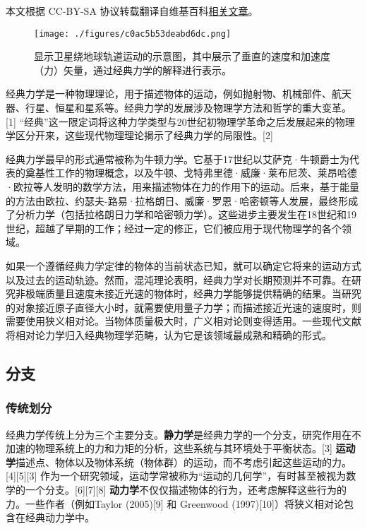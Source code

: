 
本文根据 CC-BY-SA 协议转载翻译自维基百科\href{https://en.wikipedia.org/wiki/Classical_mechanics}{相关文章}。

\begin{figure}[ht]
\centering
\texttt{[image: ./figures/c0ac5b53deabd6dc.png]}
\caption{显示卫星绕地球轨道运动的示意图，其中展示了垂直的速度和加速度（力）矢量，通过经典力学的解释进行表示。} \label{fig_JDLX_1}
\end{figure}
经典力学是一种物理理论，用于描述物体的运动，例如抛射物、机械部件、航天器、行星、恒星和星系等。经典力学的发展涉及物理学方法和哲学的重大变革。[1] “经典”这一限定词将这种力学类型与20世纪初物理学革命之后发展起来的物理学区分开来，这些现代物理理论揭示了经典力学的局限性。[2]

经典力学最早的形式通常被称为牛顿力学。它基于17世纪以艾萨克·牛顿爵士为代表的奠基性工作的物理概念，以及牛顿、戈特弗里德·威廉·莱布尼茨、莱昂哈德·欧拉等人发明的数学方法，用来描述物体在力的作用下的运动。后来，基于能量的方法由欧拉、约瑟夫-路易·拉格朗日、威廉·罗恩·哈密顿等人发展，最终形成了分析力学（包括拉格朗日力学和哈密顿力学）。这些进步主要发生在18世纪和19世纪，超越了早期的工作；经过一定的修正，它们被应用于现代物理学的各个领域。

如果一个遵循经典力学定律的物体的当前状态已知，就可以确定它将来的运动方式以及过去的运动轨迹。然而，混沌理论表明，经典力学对长期预测并不可靠。在研究非极端质量且速度未接近光速的物体时，经典力学能够提供精确的结果。当研究的对象接近原子直径大小时，就需要使用量子力学；而描述接近光速的速度时，则需要使用狭义相对论。当物体质量极大时，广义相对论则变得适用。一些现代文献将相对论力学归入经典物理学范畴，认为它是该领域最成熟和精确的形式。
\subsection{分支}  
\subsubsection{传统划分}  
经典力学传统上分为三个主要分支。\textbf{静力学}是经典力学的一个分支，研究作用在不加速的物理系统上的力和力矩的分析，这些系统与其环境处于平衡状态。[3] \textbf{运动学}描述点、物体以及物体系统（物体群）的运动，而不考虑引起这些运动的力。[4][5][3] 作为一个研究领域，运动学常被称为“运动的几何学”，有时甚至被视为数学的一个分支。[6][7][8] \textbf{动力学}不仅仅描述物体的行为，还考虑解释这些行为的力。一些作者（例如Taylor (2005)[9] 和 Greenwood (1997)[10]）将狭义相对论包含在经典动力学中。

